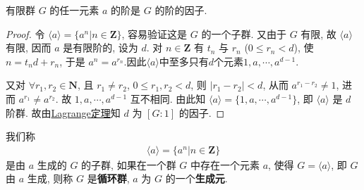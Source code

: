 \documentclass[../../main.tex]{subfiles}
\begin{document}
\begin{corollary}\label{corollary:抽象代数-推论 1.3.4}
有限群 \( G \) 的任一元素 \( a \) 的阶是 \( G \) 的阶的因子.
\end{corollary}
\begin{proof}
令 \( \langle a \rangle = \{a^n|n \in \mathbf{Z}\} \), 容易验证这是 \( G \) 的一个子群. 又由于 \( G \) 有限, 故 \( \langle a \rangle \) 有限, 因而 \( a \) 是有限阶的, 设为 \( d \). 对 \( n \in \mathbf{Z} \) 有 \( t_n \) 与 \( r_n \) (\( 0 \leqslant r_n < d \)), 使 \( n = t_nd + r_n \), 于是 \( a^n = a^{r_n} \).因此$\langle a \rangle$中至多只有$d$个元素$1,a,\cdots,a^{d-1}$.

又对 \( \forall r_1, r_2 \in \mathbf{N} \), 且 \( r_1 \neq r_2 \), \( 0 \leqslant r_1, r_2 < d \), 则 \( |r_1 - r_2| < d \), 从而 \( a^{r_1 - r_2} \neq 1 \), 进而 \( a^{r_1} \neq a^{r_2} \). 故 \( 1, a, \cdots, a^{d-1} \) 互不相同.
由此知 \( \langle a \rangle = \{1, a, \cdots, a^{d-1}\} \), 即 \( \langle a \rangle \) 是 \( d \) 阶群. 故由\hyperref[theorem:抽象代数-Lagrange定理-定理 1.3.3]{Lagrange定理}知 \( d \) 为 \( [G:1] \) 的因子.
\end{proof}

\begin{definition}[循环群]
我们称
\begin{align*}
\langle a \rangle = \{a^n|n \in \mathbf{Z}\}
\end{align*}
是由 \( a \) 生成的 \( G \) 的子群, 如果在一个群 \( G \) 中存在一个元素 \( a \), 使得 \( G = \langle a \rangle \), 即 \( G \) 由 \( a \) 生成, 则称 \( G \) 是\textbf{循环群}, \( a \) 为 \( G \) 的一个\textbf{生成元}.
\end{definition}
\end{document}
